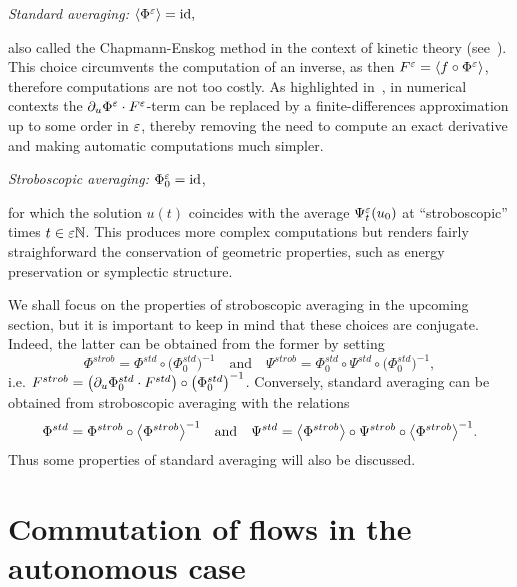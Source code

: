 \smallskip\noindent
\textit{Standard averaging:} 
%
$ \langle \Phi^{\varepsilon} \rangle = \operatorname{id} ,$ 

\noindent\hfil\parbox[t]{0.85\textwidth}{%
also called the Chapmann-Enskog method in the
context of kinetic theory (see~\cite{chartier.2020.averaging}). This
choice circumvents the computation of an inverse, as then $F^{\varepsilon} = \langle f
\circ \Phi^{\varepsilon} \rangle$, therefore computations are not too costly. As
highlighted in~\cite{chartier.2020.derivative}, in numerical contexts
the $\partial_u \Phi^{\varepsilon} \cdot F^{\varepsilon}$-term can be replaced by a
finite-differences approximation up to some order in $\varepsilon$, thereby 
removing the need to compute an exact derivative and making automatic 
computations much simpler.
}\hfil%

\medskip\noindent
\textit{Stroboscopic averaging:}
\( \Phi^{\varepsilon}_0 = \operatorname{id} \),

\noindent\hfil\parbox[t]{0.85\textwidth}{%
for which the solution \( u(t) \) coincides with
the average \( \Psi^{\varepsilon}_t(u_0) \) at ``stroboscopic'' times \( t \in \varepsilon
\mathbb{N} \). This produces more complex computations but renders fairly
straighforward the conservation of geometric properties, such as energy
preservation or symplectic structure. 
}\hfil%

\medskip\noindent %
We shall focus on the properties of stroboscopic averaging in the upcoming
section, but it is important to keep in mind that these choices are
conjugate. Indeed, the latter can be obtained from the former by setting 
\begin{equation*}
  \Phi^{strob} = \Phi^{std} \circ \big( \Phi_0^{std} \big)^{-1} 
  \quad
  \text{and} 
  \quad
  \Psi^{strob} 
  = \Phi_0^{std} \circ \Psi^{std} \circ \big( \Phi_0^{std} \big)^{-1} ,
\end{equation*}
i.e. $F^{strob} = \left( \partial_u \Phi_0^{std} \cdot F^{std} \right) \circ
\big( \Phi_0^{std} \big)^{-1}$. Conversely, standard averaging can be
obtained from stroboscopic averaging with the relations
\begin{equation} \label{sec:presentation:eq:strob2std}
  \Phi^{std} = \Phi^{strob} \circ \big \langle \Phi^{strob} \big \rangle^{-1} 
  \quad
  \text{and} 
  \quad
  \Psi^{std} 
  = \big \langle\Phi^{strob}\big \rangle \circ \Psi^{strob} \circ 
    \big \langle\Phi^{strob}\big \rangle^{-1} .
\end{equation}
Thus some properties of standard averaging will also be discussed. 



\section{Commutation of flows in the autonomous case} 
\label{sec:autonomous}

